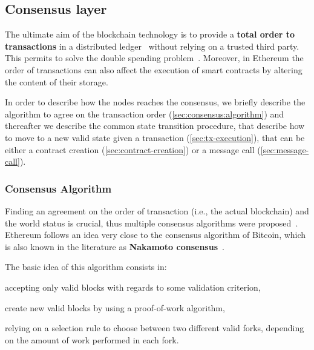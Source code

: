 \subsection{Consensus layer}
\label{sec:consensus}

The ultimate aim of the blockchain technology is to provide a \textbf{total
order to transactions} in a distributed ledger~\cite{bib:the-quest} without
relying on a trusted third party. This permits to solve the double spending
problem~\cite{bib:bitcoin}. Moreover, in Ethereum the order of transactions can
also affect the execution of smart contracts by altering the content of their
storage.

In order to describe how the nodes reaches the consensus, we briefly describe
the algorithm to agree on the transaction order
(\autoref{sec:consensus:algorithm}) and thereafter we describe the common state
transition procedure, that describe how to move to a new valid state given a
transaction (\autoref{sec:tx-execution}), that can be either a contract creation
(\autoref{sec:contract-creation}) or a message call
(\autoref{sec:message-call}).


\subsubsection{Consensus Algorithm}
\label{sec:consensus:algorithm}

Finding an agreement on the order of transaction (i.e., the actual blockchain)
and the world status is crucial, thus multiple consensus algorithms were
proposed~\cite{bib:the-quest}. Ethereum follows an idea very close to the
consensus algorithm of Bitcoin, which is also known in the literature as
\textbf{Nakamoto consensus}~\cite{bib:bitcoin-ng}.

The basic idea of this algorithm consists in:
\begin{enumerate*}[label=(\arabic*)]
    \item accepting only valid blocks with regards to some validation criterion,
    \item create new valid blocks by using a proof-of-work algorithm,
    \item relying on a selection rule to choose between two different
    valid forks, depending on the amount of work performed in each fork.
\end{enumerate*}

